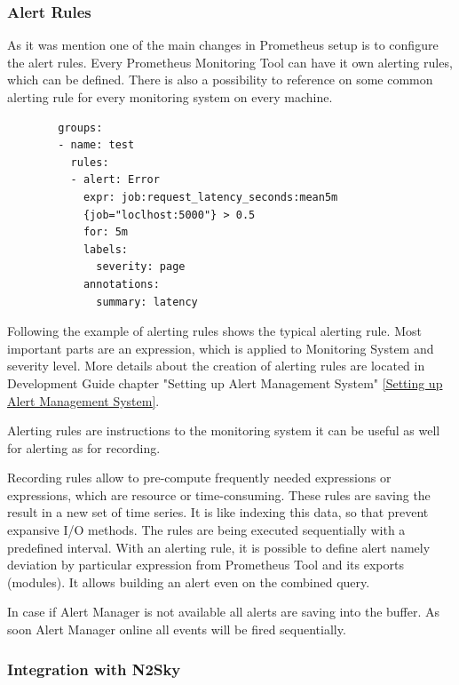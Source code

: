 \subsubsection{Alert Rules}\label{Alert Rules}

As it was mention one of the main changes in Prometheus setup is to configure the alert rules. Every Prometheus Monitoring Tool can have it own alerting rules, which can be defined. There is also a possibility to reference on some common alerting rule for every monitoring system on every machine. 

 \begin{lstlisting}
        groups:
        - name: test
          rules:
          - alert: Error
            expr: job:request_latency_seconds:mean5m
            {job="loclhost:5000"} > 0.5
            for: 5m
            labels:
              severity: page
            annotations:
              summary: latency
\end{lstlisting}

Following the example of alerting rules shows the typical alerting rule. Most important parts are an expression, which is applied to Monitoring System and severity level.  More details about the creation of alerting rules are located in Development Guide chapter "Setting up Alert Management System" \autoref{Setting up Alert Management System}.

Alerting rules are instructions to the monitoring system it can be useful as well for alerting as for recording. 

Recording rules allow to pre-compute frequently needed expressions or expressions, which are resource or time-consuming.  These rules are saving the result in a new set of time series. It is like indexing this data, so that prevent expansive I/O methods. 
The rules are being executed sequentially with a predefined interval. 
With an alerting rule, it is possible to define alert namely deviation by particular expression from Prometheus Tool and its exports (modules). It allows building an alert even on the combined query. 

In case if Alert Manager is not available all alerts are saving into the buffer. As soon Alert Manager online all events will be fired sequentially. 



\subsubsection{Integration with N2Sky}\label{Integration with N2Sky Alerting}

